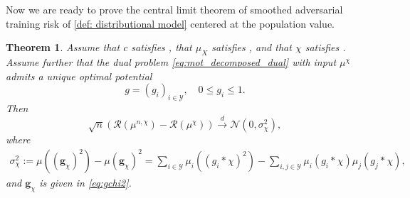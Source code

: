\documentclass{amsart}
\theoremstyle{plain}
\numberwithin{equation}{section}\newtheorem{theorem}{Theorem}[section]
\theoremstyle{remark}
\begin{document}
Now we are ready to prove the central limit theorem of smoothed adversarial training risk of \eqref{def: distributional model} centered at the population value. 




\begin{theorem}
\label{thm: limit distribution for smoothed}
Assume that $c$ satisfies
,
that $\mu_X$ satisfies
,
and that $\chi$ satisfies
.
Assume further that the dual problem
\eqref{eq:mot_decomposed_dual} with input $\mu^\chi$
admits a unique optimal potential
\[
    g=(g_i)_{i\in\mathcal Y},
    \quad
    0\leq g_i\leq1.
\]
Then
\[
    \sqrt n
    \left(
        \mathscr R(\mu^{n,\chi})
        -
        \mathscr R(\mu^\chi)
    \right)
    \overset{d}{\longrightarrow}
    \mathcal N(0,\sigma_\chi^2),
\]
where
\begin{align*}
    \sigma_\chi^2
    :=
    \mu\left((\bm g_\chi)^2\right)
    -
    \mu(\bm g_\chi)^2
    =
    \sum_{i\in\mathcal Y}
    \mu_i\left((g_i*\chi)^2\right)
    -
    \sum_{i,j\in\mathcal Y}
    \mu_i(g_i*\chi)\mu_j(g_j*\chi),
\end{align*}
and $\bm g_\chi$ is given in \eqref{eq:gchi2}.
\end{theorem}
\end{document}
